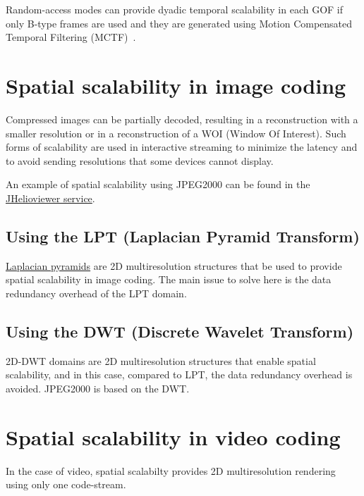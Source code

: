 Random-access modes can provide dyadic temporal scalability in each
GOF if only B-type frames are used and they are generated using Motion
Compensated Temporal Filtering (MCTF)~\cite{vruiz__MCTF}.


\section{Spatial scalability in image coding}


Compressed images can be partially decoded, resulting in a
reconstruction with a smaller resolution or in a reconstruction of a
WOI (Window Of Interest). Such forms of scalability are used in
interactive streaming to minimize the latency and to avoid sending
resolutions that some devices cannot display.

An example of spatial scalability using JPEG2000 can be found in the
\href{https://www.jhelioviewer.org/}{JHelioviewer service}.

\subsection{Using the LPT (Laplacian Pyramid Transform)}

\href{https://en.wikipedia.org/wiki/Pyramid_(image_processing)#Laplacian_pyramid}{Laplacian
  pyramids} are 2D multiresolution structures that be used to provide
spatial scalability in image coding. The main issue to solve here is
the data redundancy overhead of the LPT domain.

\subsection{Using the DWT (Discrete Wavelet Transform)}

2D-DWT domains are 2D multiresolution structures that enable spatial
scalability, and in this case, compared to LPT, the data redundancy
overhead is avoided. JPEG2000 is based on the DWT.


\section{Spatial scalability in video coding}


In the case of video, spatial scalabilty provides 2D multiresolution
rendering using only one code-stream.

